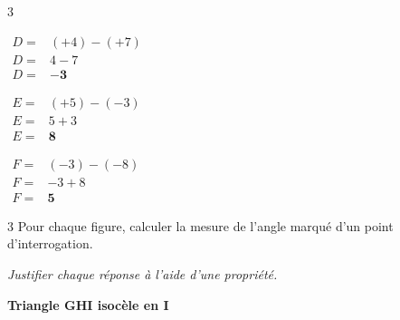 \documentclass[a4paper]{book}
\begin{document}
{\begin{exerciceNote}{3}
        \begin{minipage}{0.3\linewidth}
            $\begin{array}{ll}
                D = & (+4) - (+7) \\[1ex]
                D = & 4 - 7 \\[1ex]
                D = & \mathbf{-3}
            \end{array}$
        \end{minipage}
        \hfill \vline \hfill
        \begin{minipage}{0.33\linewidth}
            $\begin{array}{ll}
                E = & (+5) - (-3) \\[1ex]
                E = & 5 + 3 \\[1ex]
                E = & \mathbf{8}
            \end{array}$
        \end{minipage}
        \hfill \vline \hfill
        \begin{minipage}{0.3\linewidth}
            $\begin{array}{ll}
                F = & (-3) - (-8) \\[1ex]
                F = & -3 + 8 \\[1ex]
                F = & \mathbf{5}
            \end{array}$
        \end{minipage}
    \end{exerciceNote}
    

\newpage

    \begin{exerciceNote}{3}
        Pour chaque figure, calculer la mesure de l'angle marqué d'un point d'interrogation. 
        
        \textit{Justifier chaque réponse à l'aide d'une propriété.}

        \begin{minipage}{0.32\linewidth}
             \begin{center}     
                \textbf{Triangle GHI isocèle en I} 
           
            \end{center}
            

\end{minipage}
\end{exerciceNote}}
\end{document}
